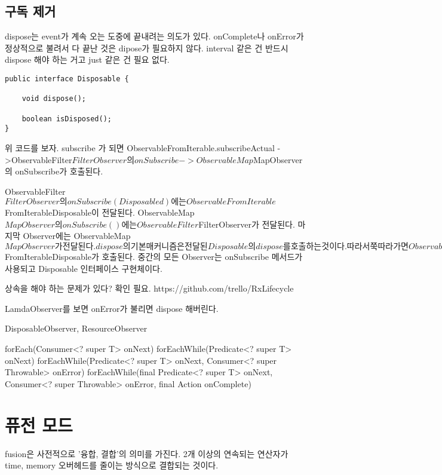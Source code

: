 \documentclass{book}
\begin{document}
\subsection{구독 제거}
dispose는 event가 계속 오는 도중에 끝내려는 의도가 있다. onComplete나 onError가 정상적으로 불려서 다 끝난 것은 dipose가 필요하지 않다.
interval 같은 건 반드시 dispose  해야 하는 거고 just 같은 건 필요 없다.


\begin{verbatim}
public interface Disposable {

    void dispose();

    boolean isDisposed();
}
\end{verbatim}

위 코드를 보자.
subscribe 가 되면 
ObservableFromIterable.subscribeActual
->ObservableFilter$FilterObserver의 onSubscribe
->ObservableMap$MapObserver의 onSubscribe가 호출된다.

ObservableFilter$FilterObserver의 onSubscribe(Disposable d)에는 
ObservableFromIterable$FromIterableDisposable이 전달된다.
ObservableMap$MapObserver의 onSubscribe()에는 ObservableFilter$FilterObserver가 전달된다.
마지막 Observer에는 ObservableMap$MapObserver가 전달된다.
dispose의 기본 매커니즘은 전달된 Disposable의 dispose를 호출하는 것이다.
따라서 쭉 따라가면 ObservableFromIterable$FromIterableDisposable가  호출된다.
중간의 모든 Observer는 onSubscribe 메서드가 사용되고 Disposable 인터페이스 구현체이다.

 


상속을 해야 하는 문제가 있다? 확인 필요.
https://github.com/trello/RxLifecycle

LamdaObserver를 보면 onError가 불리면 dispose 해버린다.

DisposableObserver, ResourceObserver

forEach(Consumer<? super T> onNext)
forEachWhile(Predicate<? super T> onNext)
forEachWhile(Predicate<? super T> onNext, Consumer<? super Throwable> onError)
forEachWhile(final Predicate<? super T> onNext, Consumer<? super Throwable> onError,
            final Action onComplete)

\section{퓨전 모드}
fusion은 사전적으로 '융합, 결합'의 의미를 가진다.
2개 이상의 연속되는 연산자가 time, memory 오버헤드를 줄이는 방식으로 결합되는 것이다.
\end{document}
